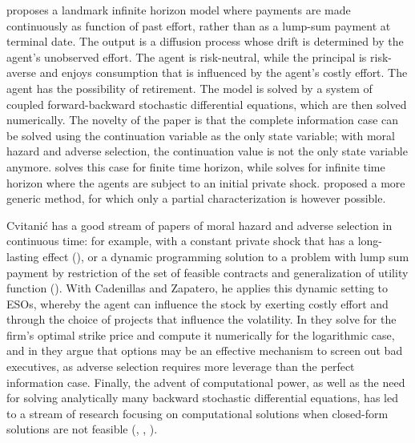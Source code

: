     \cite{sannikov2008continuous} proposes a landmark infinite horizon model where payments are made continuously as function of past effort, rather than as a lump-sum payment at terminal date. The output is a diffusion process whose drift is determined by the agent's unobserved effort. The agent is risk-neutral, while the principal is risk-averse and enjoys consumption that is influenced by the agent's costly effort. The agent has the possibility of retirement. The model is solved by a system of coupled forward-backward stochastic differential equations, which are then solved numerically.
    The novelty of the paper is that the complete information case can be solved using the continuation variable as the only state variable; with moral hazard and adverse selection, the continuation value is not the only state variable anymore. \cite{sannikov2008continuous} solves this case for finite time horizon, while \cite{cvitanic2013dynamics} solves for infinite time horizon where the agents are subject to an initial private shock. \cite{williams2009dynamic} proposed a more generic method, for which only a partial characterization is however possible. 

    Cvitanić has a good stream of papers of moral hazard and adverse selection in continuous time: for example, with a constant private shock that has a long-lasting effect (\cite{cvitanic2013dynamics}), or a dynamic programming solution to a problem with lump sum payment by restriction of the set of feasible contracts and generalization of utility function (\cite{cvitanic2018dynamic}). With Cadenillas and Zapatero, he applies this dynamic setting to ESOs, whereby the agent can influence the stock by exerting costly effort and through the choice of projects that influence the volatility. In \cite{cadenillas2002executive} they solve for the firm's optimal strike price and compute it numerically for the logarithmic case, and in \cite{cadenillas2005executive} they argue that options may be an effective mechanism to screen out bad executives, as adverse selection requires more leverage than the perfect information case.
    Finally, the advent of computational power, as well as the need for solving analytically many backward stochastic differential equations, has led to a stream of research focusing on computational solutions when closed-form solutions are not feasible (\cite{azar2018computational}, \cite{dutting2021complexity}, \cite{dutting2023multi}). 




